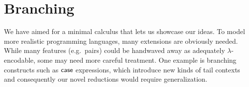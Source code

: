 \documentclass[a4paper, 11pt,titlepage, openright, twoside]{report}
\newcommand{\keyword}[1]{\textsf{\textup{#1}}}
\newcommand{\KwHandle}{\keyword{handle}}
\newcommand{\Handle}{\KwHandle\;}
\newcommand{\KwWith}{\keyword{with}}
\newcommand{\With}{\;\KwWith\;}
\newcommand{\Letrec}[3]{\keyword{letrec}\:#1\:\keyword{=}\:#2\:\keyword{in}\:#3}
\newcommand{\+}{\enspace}
\begin{document}

\section{Branching}
We have aimed for a minimal calculus that lets us showcase our ideas.
To model more realistic programming languages,
many extensions are obviously needed.
While many features (e.g.\  pairs)
could be handwaved away as adequately $λ$-encodable,
some may need more careful treatment.
One example is branching constructs such as $\keyword{case}$ expressions,
which introduce new kinds of tail contexts
and consequently our novel reductions would require generalization.

\printbibliography[heading=bibintoc]
\end{document}
